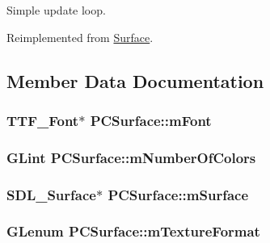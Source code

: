 Simple update loop. 



Reimplemented from \hyperlink{classSurface_a36094693997d1cd7bdc6dca831952de8}{Surface}.



\subsection{Member Data Documentation}
\subsubsection[{\texorpdfstring{m\+Font}{mFont}}]{\setlength{\rightskip}{0pt plus 5cm}T\+T\+F\+\_\+\+Font$\ast$ P\+C\+Surface\+::m\+Font\hspace{0.3cm}{\ttfamily [private]}}\hypertarget{classPCSurface_a805c3914db0f5ee9861fb521456f6aa3}{}\label{classPCSurface_a805c3914db0f5ee9861fb521456f6aa3}
\subsubsection[{\texorpdfstring{m\+Number\+Of\+Colors}{mNumberOfColors}}]{\setlength{\rightskip}{0pt plus 5cm}G\+Lint P\+C\+Surface\+::m\+Number\+Of\+Colors\hspace{0.3cm}{\ttfamily [private]}}\hypertarget{classPCSurface_ac304930d496687ba20bac20358153ff6}{}\label{classPCSurface_ac304930d496687ba20bac20358153ff6}
\subsubsection[{\texorpdfstring{m\+Surface}{mSurface}}]{\setlength{\rightskip}{0pt plus 5cm}S\+D\+L\+\_\+\+Surface$\ast$ P\+C\+Surface\+::m\+Surface\hspace{0.3cm}{\ttfamily [private]}}\hypertarget{classPCSurface_a7f07033400779e51dff4205be13605eb}{}\label{classPCSurface_a7f07033400779e51dff4205be13605eb}
\subsubsection[{\texorpdfstring{m\+Texture\+Format}{mTextureFormat}}]{\setlength{\rightskip}{0pt plus 5cm}G\+Lenum P\+C\+Surface\+::m\+Texture\+Format\hspace{0.3cm}{\ttfamily [private]}}\hypertarget{classPCSurface_ae908fec720f181dd41b7beda56feb2b3}{}\label{classPCSurface_ae908fec720f181dd41b7beda56feb2b3}
